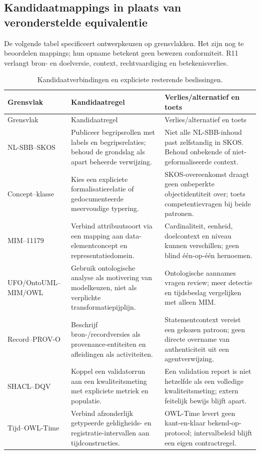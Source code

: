 \subsection{Kandidaatmappings in plaats van veronderstelde equivalentie}
De volgende tabel specificeert ontwerpkeuzen op grensvlakken. Het zijn nog te beoordelen mappings; hun opname betekent geen bewezen conformiteit. R11 verlangt bron- en doelversie, context, rechtvaardiging en betekenisverlies.
\begin{longtable}{@{}P{.24\linewidth}P{.32\linewidth}P{.36\linewidth}@{}}
\caption{Kandidaatverbindingen en expliciete resterende beslissingen.}\\
\toprule Grensvlak & Kandidaatregel & Verlies/alternatief en toets \\ \midrule\endfirsthead
\toprule Grensvlak & Kandidaatregel & Verlies/alternatief en toets \\ \midrule\endhead
NL-SBB--SKOS \citep{S14,S31} & Publiceer begripsrollen met labels en begripsrelaties; behoud de grondslag als apart beheerde verwijzing. & Niet alle NL-SBB-inhoud past zelfstandig in SKOS. Behoud onbekende of niet-geformaliseerde context. \\
Concept--klasse \citep{S31,S30} & Kies een expliciete formalisatierelatie of gedocumenteerde meervoudige typering. & SKOS-overeenkomst draagt geen onbeperkte objectidentiteit over; toets competentievragen bij beide patronen. \\
MIM--11179 \citep{S13,S08} & Verbind attribuutsoort via een mapping aan data-elementconcept en representatiedomein. & Cardinaliteit, eenheid, doelcontext en niveau kunnen verschillen; geen blind één-op-één hernoemen. \\
UFO/OntoUML--MIM/OWL \citep{L09,S13,S30} & Gebruik ontologische analyse als motivering van modelkeuzen, niet als verplichte transformatiepijplijn. & Ontologische aannames vragen review; meer detectie en tijdsbeslag vergelijken met alleen MIM. \\
Record--PROV-O \citep{S33} & Beschrijf bron-/recordversies als provenance-entiteiten en afleidingen als activiteiten. & Statementcontext vereist een gekozen patroon; geen directe overname van authenticiteit uit een agentverwijzing. \\
SHACL--DQV \citep{S32,S34} & Koppel een validatorrun aan een kwaliteitsmeting met expliciete metriek en populatie. & Een validation report is niet hetzelfde als een volledige kwaliteitsmeting; extern feitelijk bewijs blijft apart. \\
Tijd--OWL-Time \citep{L14,S37} & Verbind afzonderlijk getypeerde geldigheids- en registratie-intervallen aan tijdconstructies. & OWL-Time levert geen kant-en-klaar bekend-op-protocol; intervalbeleid blijft een eigen contractregel. \\

\end{longtable}
